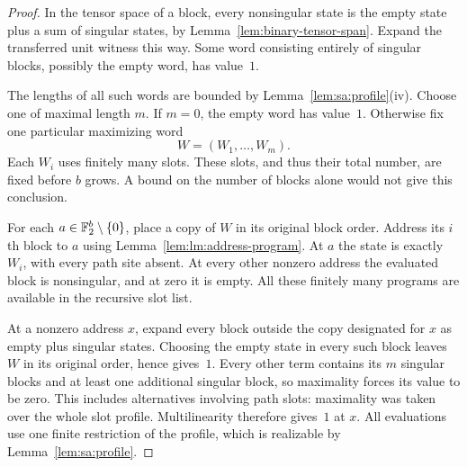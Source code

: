 \begin{proof}
In the tensor space of a block, every nonsingular state is the empty
state plus a sum of singular states, by
Lemma~\ref{lem:binary-tensor-span}.  Expand the transferred unit
witness this way.  Some word consisting entirely of singular blocks,
possibly the empty word, has value~$1$.

The lengths of all such words are bounded by
Lemma~\ref{lem:sa:profile}\textup{(iv)}.  Choose one of maximal
length $m$.  If $m=0$, the empty word has value~$1$.  Otherwise fix
one particular maximizing word
\[
 W=(W_1,\ldots,W_m).
\]
Each $W_i$ uses finitely many slots.  These slots, and thus their total
number, are fixed before $b$ grows.  A bound on the number of blocks
alone would not give this conclusion.

For each $a\in\mathbb F_2^b\setminus\{0\}$, place a copy of $W$ in its
original block order.  Address its $i$th block to $a$ using
Lemma~\ref{lem:lm:address-program}.  At $a$ the state is exactly
$W_i$, with every path site absent.  At every other nonzero address
the evaluated block is nonsingular, and at zero it is empty.  All
these finitely many programs are available in the recursive slot list.

At a nonzero address $x$, expand every block outside the copy
designated for $x$ as empty plus singular states.  Choosing the empty
state in every such block leaves $W$ in its original order, hence
gives~$1$.  Every other term contains its $m$ singular blocks and at
least one additional singular block, so maximality forces its value
to be zero.  This includes alternatives involving path slots:
maximality was taken over the whole slot profile.  Multilinearity
therefore gives~$1$ at $x$.  All evaluations use one finite restriction
of the profile, which is realizable by Lemma~\ref{lem:sa:profile}.
\end{proof}


